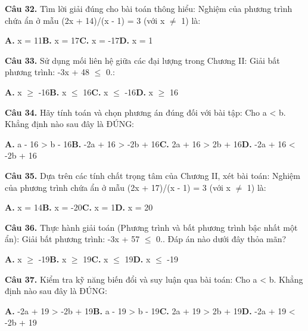 \documentclass[11pt,a4paper]{article}
\begin{document}
\textbf{\color{primary} Câu 32.} Tìm lời giải đúng cho bài toán thông hiểu: Nghiệm của phương trình chứa ẩn ở mẫu (2x + 14)/(x - 1) = 3 (với x $\ne$ 1) là:\par
\hspace*{1.5em}\textbf{A.} x = 11\quad\quad \textbf{B.} x = 17\quad\quad \textbf{C.} x = -17\quad\quad \textbf{D.} x = 1\par\vspace{2pt}
\textbf{\color{primary} Câu 33.} Sử dụng mối liên hệ giữa các đại lượng trong Chương II: Giải bất phương trình: -3x + 48 $\le$ 0.:\par
\hspace*{1.5em}\textbf{A.} x $\ge$ -16\quad\quad \textbf{B.} x $\le$ 16\quad\quad \textbf{C.} x $\le$ -16\quad\quad \textbf{D.} x $\ge$ 16\par\vspace{2pt}
\textbf{\color{primary} Câu 34.} Hãy tính toán và chọn phương án đúng đối với bài tập: Cho a < b. Khẳng định nào sau đây là ĐÚNG:\par
\hspace*{1.5em}\textbf{A.} a - 16 > b - 16\quad\quad \textbf{B.} -2a + 16 > -2b + 16\quad\quad \textbf{C.} 2a + 16 > 2b + 16\quad\quad \textbf{D.} -2a + 16 < -2b + 16\par\vspace{2pt}
\textbf{\color{primary} Câu 35.} Dựa trên các tính chất trọng tâm của Chương II, xét bài toán: Nghiệm của phương trình chứa ẩn ở mẫu (2x + 17)/(x - 1) = 3 (với x $\ne$ 1) là:\par
\hspace*{1.5em}\textbf{A.} x = 14\quad\quad \textbf{B.} x = -20\quad\quad \textbf{C.} x = 1\quad\quad \textbf{D.} x = 20\par\vspace{2pt}
\textbf{\color{primary} Câu 36.} Thực hành giải toán (Phương trình và bất phương trình bậc nhất một ẩn): Giải bất phương trình: -3x + 57 $\le$ 0.. Đáp án nào dưới đây thỏa mãn?\par
\hspace*{1.5em}\textbf{A.} x $\ge$ -19\quad\quad \textbf{B.} x $\ge$ 19\quad\quad \textbf{C.} x $\le$ 19\quad\quad \textbf{D.} x $\le$ -19\par\vspace{2pt}
\textbf{\color{primary} Câu 37.} Kiểm tra kỹ năng biến đổi và suy luận qua bài toán: Cho a < b. Khẳng định nào sau đây là ĐÚNG:\par
\hspace*{1.5em}\textbf{A.} -2a + 19 > -2b + 19\quad\quad \textbf{B.} a - 19 > b - 19\quad\quad \textbf{C.} 2a + 19 > 2b + 19\quad\quad \textbf{D.} -2a + 19 < -2b + 19\par\vspace{2pt}
\end{document}
